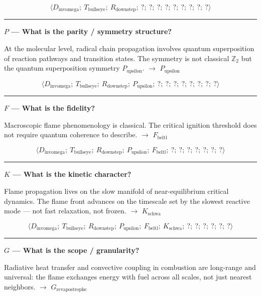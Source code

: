 \documentclass[12pt,a4paper]{article}
\begin{document}
\[\langle D_{\text{invomega}};\ T_{\text{bullseye}};\ R_{\text{downstep}};\ ?;\ ?;\ ?;\ ?;\ ?;\ ?;\ ?;\ ?;\ ? \rangle\]

\begin{center}
\rule{0.5\textwidth}{0.4pt}
\end{center}

\textbf{$P$ --- What is the parity / symmetry structure?}

At the molecular level, radical chain propagation involves quantum superposition of reaction pathways and transition states. The symmetry is not classical $\mathbb{Z}_2$ but the quantum superposition symmetry $P_{\text{upsilon}}$. $\rightarrow$ $P_{\text{upsilon}}$

\[\langle D_{\text{invomega}};\ T_{\text{bullseye}};\ R_{\text{downstep}};\ P_{\text{upsilon}};\ ?;\ ?;\ ?;\ ?;\ ?;\ ?;\ ?;\ ? \rangle\]

\begin{center}
\rule{0.5\textwidth}{0.4pt}
\end{center}

\textbf{$F$ --- What is the fidelity?}

Macroscopic flame phenomenology is classical. The critical ignition threshold does not require quantum coherence to describe. $\rightarrow$ $F_{\text{beltl}}$

\[\langle D_{\text{invomega}};\ T_{\text{bullseye}};\ R_{\text{downstep}};\ P_{\text{upsilon}};\ F_{\text{beltl}};\ ?;\ ?;\ ?;\ ?;\ ?;\ ?;\ ? \rangle\]

\begin{center}
\rule{0.5\textwidth}{0.4pt}
\end{center}

\textbf{$K$ --- What is the kinetic character?}

Flame propagation lives on the slow manifold of near-equilibrium critical dynamics. The flame front advances on the timescale set by the slowest reactive mode --- not fast relaxation, not frozen. $\rightarrow$ $K_{\text{schwa}}$

\[\langle D_{\text{invomega}};\ T_{\text{bullseye}};\ R_{\text{downstep}};\ P_{\text{upsilon}};\ F_{\text{beltl}};\ K_{\text{schwa}};\ ?;\ ?;\ ?;\ ?;\ ?;\ ? \rangle\]

\begin{center}
\rule{0.5\textwidth}{0.4pt}
\end{center}

\textbf{$G$ --- What is the scope / granularity?}

Radiative heat transfer and convective coupling in combustion are long-range and universal: the flame exchanges energy with fuel across all scales, not just nearest neighbors. $\rightarrow$ $G_{\text{revapostrophe}}$
\end{document}
